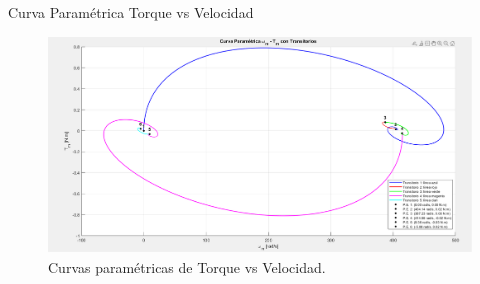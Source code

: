 \documentclass[12pt]{beamer}
\begin{document}
\begin{frame}{Curva Paramétrica Torque vs Velocidad}
    \begin{figure}[H]
    \centering
    \includegraphics[width=1\textwidth]{Imagenes/CurvaParametricaWm-Tm.png}
    \caption{Curvas paramétricas de Torque vs Velocidad.}
    \label{fig:CurvaParametricaTorquevsVelocidad}
\end{figure}
\end{frame}
\end{document}
